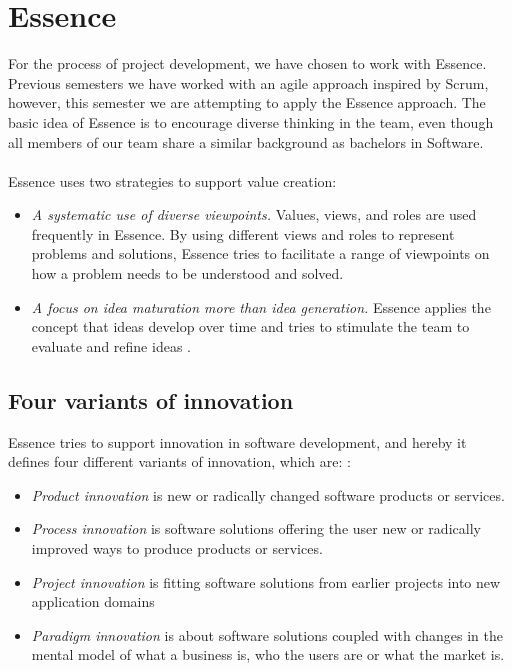 \section{Essence}
For the process of project development, we have chosen to work with Essence. 
Previous semesters we have worked with an agile approach inspired by Scrum, however, this semester we are attempting to apply the Essence approach.
The basic idea of Essence is to encourage diverse thinking in the team, even though all members of our team share a similar background as bachelors in Software.
\\\\
Essence uses two strategies to support value creation:
\begin{itemize}
    \item \textit{A systematic use of diverse viewpoints.} 
    Values, views, and roles are used frequently in Essence. 
    By using different views and roles to represent problems and solutions, Essence tries to facilitate a range of viewpoints on how a problem needs to be understood and solved.
    \item \textit{A focus on idea maturation more than idea generation.}
    Essence applies the concept that ideas develop over time and tries to stimulate the team to evaluate and refine ideas \autocite{Essence}.
\end{itemize}

\subsection{Four variants of innovation}
Essence tries to support innovation in software development, and hereby it defines four different variants of innovation, which are: \autocite{Essence}:
\begin{itemize}
    \item \textit{Product innovation} is new or radically changed software products or services. 
    \item \textit{Process innovation} is software solutions offering the user new or radically improved ways to produce products or services.
    \item \textit{Project innovation} is fitting software solutions from earlier projects into new application domains
    \item \textit{Paradigm innovation} is about software solutions coupled with changes in the mental model of what a business is, who the users are or what the market is.
\end{itemize}

